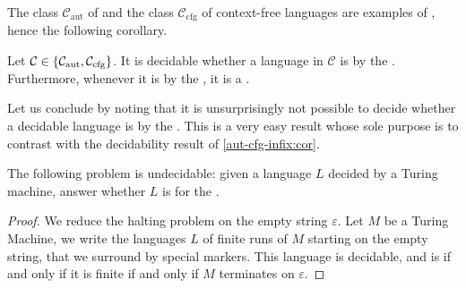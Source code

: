 The class $\mathcal{C}_\text{aut}$ of  and the class
$\mathcal{C}_{\text{cfg}}$ of context-free languages are examples of
, hence the following corollary.

\begin{corollary}
    \label{aut-cfg-infix:cor}
    Let $\mathcal{C} \in \{  \mathcal{C}_\text{aut}, \mathcal{C}_{\text{cfg}} \}$.
    It is decidable whether a language in $\mathcal{C}$ is 
    by the .
    Furthermore, whenever it is  by the ,
    it is a .
\end{corollary}

Let us conclude by noting that it is unsurprisingly not possible to decide
whether a decidable language is  by the . This is a very easy result whose sole purpose is to contrast with
the decidability result of \cref{aut-cfg-infix:cor}.

\begin{remark}
    The following problem is undecidable: given a language $L$
    decided by a Turing machine, answer whether 
    $L$ is  for the .
\end{remark}
\begin{proof}
    We reduce the halting problem on the empty string $\varepsilon$.
    Let $M$ be a Turing Machine, we write the languages $L$ of finite runs
    of $M$ starting on the empty string,
    that we surround by special markers. This language is decidable,
    and 
    is
     if and only if it is finite
    if and only if $M$ terminates on $\varepsilon$.
\end{proof}
